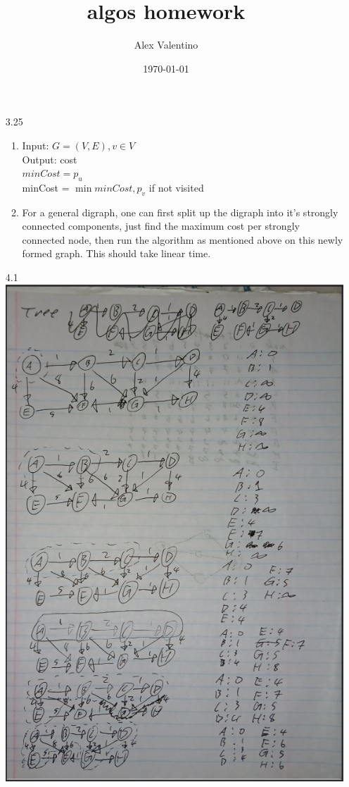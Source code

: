 \documentclass[12pt, letterpaper]{article}
\date{\today}
\author{Alex Valentino}
\title{algos homework}
\begin{document}
\begin{enumerate}
	\item[3.25]
	\begin{enumerate}
		\item \begin{algorithmic}
		Input: $G = (V,E), v \in V$\\
		Output: cost\\
			$minCost = p_u$\\
			\State minCost = $\min{minCost, p_v}$
			\EndFor
		\EndFor
		\tab if not visited  
		\end{algorithmic}
		\item For a general digraph, one can first split up the digraph into it's strongly 
		connected components, just find the maximum cost per strongly connected node, then 
		run the algorithm as mentioned above on this newly formed graph.  This should take linear 
		time.  
	\end{enumerate}
	\item[4.1] \includegraphics[scale=0.9]{algosHW541png.png}

\end{enumerate}
\end{document}
